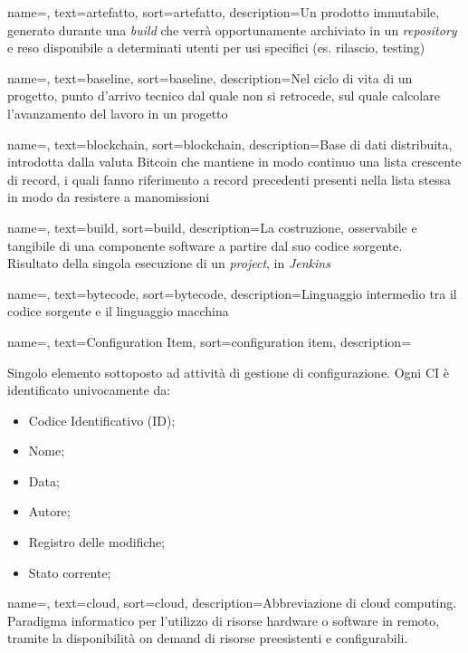 {
    name=,
    text=artefatto,
    sort=artefatto,
    description={Un prodotto immutabile, generato durante una \textit{build} che verrà opportunamente archiviato in un \textit{repository} e reso disponibile a determinati utenti per usi specifici (es. rilascio, testing)}
}

{
    name=,
    text=baseline,
    sort=baseline,
    description={Nel ciclo di vita di un progetto, punto d'arrivo tecnico dal quale non si retrocede, sul quale calcolare l'avanzamento del lavoro in un progetto}
}

{
    name=,
    text=blockchain,
    sort=blockchain,
    description={Base di dati distribuita, introdotta dalla valuta Bitcoin che mantiene in modo continuo una lista crescente di record, i quali fanno riferimento a record precedenti presenti nella lista stessa in modo da resistere a manomissioni}
}

{
    name=,
    text=build,
    sort=build,
    description={La costruzione, osservabile e tangibile di una componente software a partire dal suo codice sorgente.\\ 
    Risultato della singola esecuzione di un \textit{project}, in \textit{Jenkins}}
}

{
    name=,
    text=bytecode,
    sort=bytecode,
    description={Linguaggio intermedio tra il codice sorgente e il linguaggio macchina}
}

{
    name=,
    text=Configuration Item,
    sort=configuration item,
    description={Singolo elemento sottoposto ad attività di gestione di configurazione. Ogni CI è identificato univocamente da:
        \begin{itemize}
            \item Codice Identificativo (ID);
            \item Nome;
            \item Data;
            \item Autore;
            \item Registro delle modifiche;
            \item Stato corrente;
        \end{itemize}}
}

{
    name=,
    text=cloud,
    sort=cloud,
    description={Abbreviazione di cloud computing. Paradigma informatico per l'utilizzo di risorse hardware o software in remoto, tramite la disponibilità on demand di risorse preesistenti e configurabili.}
}


